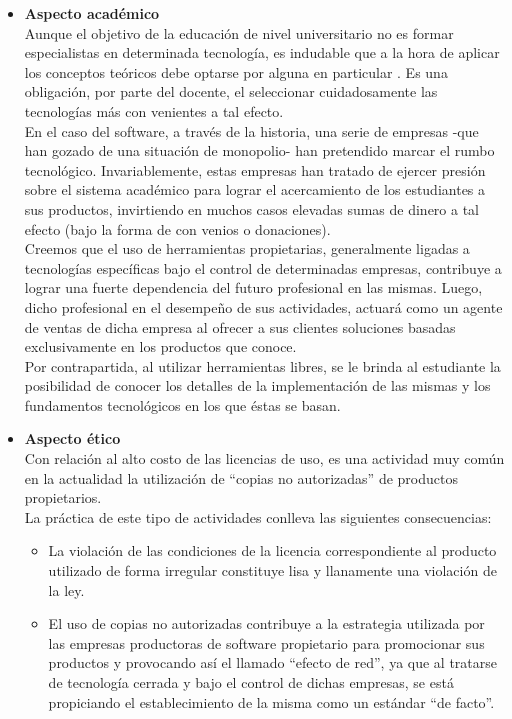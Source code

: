 \begin{itemize}
\item {\bf Aspecto académico}\\
Aunque el objetivo de la educación de nivel universitario no es formar especialistas en determinada tecnología, es indudable que a la hora de aplicar los conceptos teóricos debe optarse por alguna en particular . Es una obligación, por parte del docente, el seleccionar cuidadosamente las tecnologías más con venientes a tal efecto. \\
En el caso del software, a través de la historia, una serie de empresas -que han gozado de una situación de monopolio- han pretendido marcar el rumbo tecnológico. Invariablemente, estas empresas han tratado de ejercer presión sobre el sistema académico para lograr el acercamiento de los estudiantes a sus productos, invirtiendo en muchos casos elevadas sumas de dinero a tal efecto (bajo la forma de con venios o donaciones). \\
Creemos que el uso de herramientas propietarias, generalmente ligadas a tecnologías específicas bajo el control de determinadas empresas, contribuye a lograr una fuerte dependencia del futuro profesional en las mismas. Luego, dicho profesional en el desempeño de sus actividades, actuará como un agente de ventas de dicha empresa al ofrecer a sus clientes soluciones basadas exclusivamente en los productos que conoce. \\
Por contrapartida, al utilizar herramientas libres, se le brinda al estudiante la posibilidad de conocer los detalles de la implementación de las mismas y los fundamentos tecnológicos en los que éstas se basan.

\item {\bf Aspecto ético}\\
Con relación al alto costo de las licencias de uso, es una actividad muy común en  la actualidad la  utilización de “copias no autorizadas” de productos propietarios.\\
La práctica de este tipo de actividades conlleva las siguientes consecuencias:

\begin{itemize}
    \item La violación de las condiciones de la licencia correspondiente  al producto utilizado de forma irregular constituye lisa y llanamente una violación de la ley.
\end{itemize}
\begin{itemize}
    \item El uso de copias no autorizadas contribuye a la estrategia utilizada por las empresas productoras de software propietario para promocionar sus productos y provocando así el llamado “efecto de red”, ya que al tratarse de tecnología cerrada y bajo el control de dichas empresas, se está propiciando el establecimiento de la misma como un estándar “de facto”.
\end{itemize}
\end{itemize}

